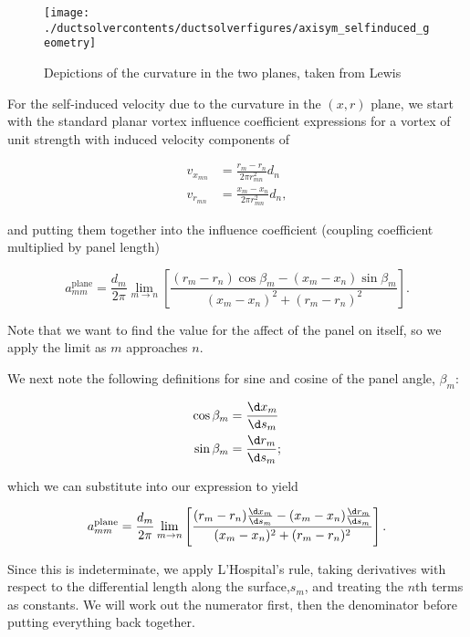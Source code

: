 \begin{figure}[h!]
	\centering
	\texttt{[image: ./ductsolvercontents/ductsolverfigures/axisym\_selfinduced\_geometry]}
	\caption{Depictions of the curvature in the two planes, taken from Lewis \cite{Lewis_1991}}
	\label{fig:axisym_selfinduced_geometry}
\end{figure}

For the self-induced velocity due to the curvature in the \((x,r)\) plane, we start with the standard planar vortex influence coefficient expressions for a vortex of unit strength with induced velocity components of

\begin{align}
	v_{x_{mn}} &= \frac{r_m - r_n}{2 \pi r^2_{mn}} d_n \\
	v_{r_{mn}} &= \frac{x_m - x_n}{2 \pi r^2_{mn}} d_n,
\end{align}

\noindent and putting them together into the influence coefficient (coupling coefficient multiplied by panel length)

\begin{equation}
	a^\text{plane}_{mm} = \frac{d_m}{2 \pi} \lim_{m\rightarrow n} \left[\frac{(r_m - r_n)\cos \beta_m  - (x_m - x_n)\sin \beta_m}{(x_m - x_n)^2+(r_m - r_n)^2}\right].
\end{equation}

\noindent Note that we want to find the value for the affect of the panel on itself, so we apply the limit as \(m\) approaches \(n\).

We next note the following definitions for sine and cosine of the panel angle, \(\beta_m\):

\begin{align}
	\cos \beta_m  &= \frac{\d x_m}{\d s_m} \\
	\sin \beta_m  &= \frac{\d r_m}{\d s_m};
\end{align}

\noindent which we can substitute into our expression to yield

\begin{equation}
	\label{eqn:aplanemmlimit}
	a^\text{plane}_{mm} = \frac{d_m}{2 \pi} \lim_{m\rightarrow n} \left[\frac{(r_m - r_n) \frac{\d x_m}{\d s_m}  - (x_m - x_n)\frac{\d r_m}{\d s_m}}{(x_m - x_n)^2+(r_m - r_n)^2}\right].
\end{equation}

Since this is indeterminate, we apply L'Hospital's rule, taking derivatives with respect to the differential length along the surface,\(s_m\), and treating the \(n\)th terms as constants.
We will work out the numerator first, then the denominator before putting everything back together.

